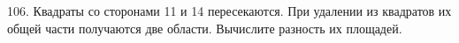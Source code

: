 106. Квадраты со сторонами 11 и 14 пересекаются. При удалении из квадратов их общей части получаются две области. Вычислите разность их площадей.\\
